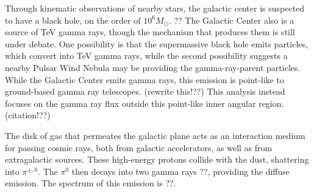 Through kinematic observations of nearby stars, the galactic center is suspected to have a black hole, on the order of $10^6 M_{\odot}$. ??
The Galactic Center also is a source of TeV gamma rays, though the mechanism that produces them is still under debate.
One possibility is that the supermassive black hole emits particles, which convert into TeV gamma rays, while the second possibility suggests a nearby Pulsar Wind Nebula may be providing the gamma-ray-parent particles.
While the Galactic Center emits gamma rays, this emission is point-like to ground-based gamma ray telescopes. (rewrite this!??)
This analysis instead focuses on the gamma ray flux outside this point-like inner angular region. (citation!??)


The disk of gas that permeates the galactic plane acts as an interaction medium for passing cosmic rays, both from galactic accelerators, as well as from extragalactic sources.
These high-energy protons collide with the dust, shattering into $\pi^{\pm,0}$.
The $\pi^0$ then decays into two gamma rays ??, providing the diffuse emission.
The spectrum of this emission is ??.


